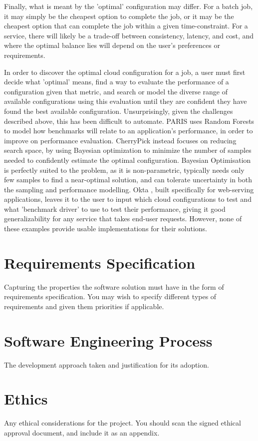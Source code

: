 \documentclass{article}
\begin{document}
Finally, what is meant by the 'optimal' configuration may differ. For a batch job, it may simply be the cheapest option to complete the job, or it may be the cheapest option that can complete the job within a given time-constraint. For a service, there will likely be a trade-off between consistency, latency, and cost, and where the optimal balance lies will depend on the user's preferences or requirements. 
\bigskip

In order to discover the optimal cloud configuration for a job, a user must first decide what 'optimal' means, find a way to evaluate the performance of a configuration given that metric, and search or model the diverse range of available configurations using this evaluation until they are confident they have found the best available configuration. Unsurprisingly, given the challenges described above, this has been difficult to automate. PARIS \cite{Yadwadkar2017} uses Random Forests to model how benchmarks will relate to an application's performance, in order to improve on performance evaluation. CherryPick \cite{Alipourfard2017} instead focuses on reducing search space, by using Bayesian optimization\cite{Shahriari2016} to minimize the number of samples needed to confidently estimate the optimal configuration. Bayesian Optimisation is perfectly suited to the problem, as it is non-parametric, typically needs only few samples to find a near-optimal solution, and can tolerate uncertainty in both the sampling and performance modelling\cite{Jones1998}. Okta \cite{Davatz2017}, built specifically for web-serving applications, leaves it to the user to input which cloud configurations to test and what 'benchmark driver' to use to test their performance, giving it good generalizability for any service that takes end-user requests. However, none of these examples provide usable implementations for their solutions.

\section{Requirements Specification}
Capturing the properties the software solution must have
in the form of requirements specification. You may wish
to specify different types of requirements and given them
priorities if applicable.
\section{Software Engineering Process}
The development approach taken and justification for its
adoption.
\section{Ethics}
Any ethical considerations for the project. You should
scan the signed ethical approval document, and include it
as an appendix. 
\end{document}
